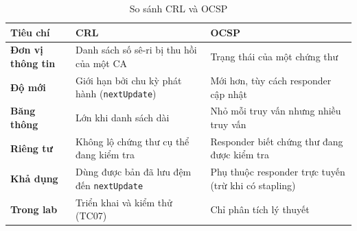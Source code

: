 \begin{table}[!htbp]
\centering
\small
\renewcommand{\arraystretch}{1.2}
\begin{tabularx}{\textwidth}{>{\raggedright\arraybackslash}p{3.2cm}>{\raggedright\arraybackslash}X>{\raggedright\arraybackslash}X}
\toprule
\textbf{Tiêu chí} & \textbf{CRL} & \textbf{OCSP} \\
\midrule
\textbf{Đơn vị thông tin} & Danh sách số sê-ri bị thu hồi của một CA & Trạng thái của một chứng thư \\
\midrule
\textbf{Độ mới} & Giới hạn bởi chu kỳ phát hành (\texttt{nextUpdate}) & Mới hơn, tùy cách responder cập nhật \\
\midrule
\textbf{Băng thông} & Lớn khi danh sách dài & Nhỏ mỗi truy vấn nhưng nhiều truy vấn \\
\midrule
\textbf{Riêng tư} & Không lộ chứng thư cụ thể đang kiểm tra & Responder biết chứng thư đang được kiểm tra \\
\midrule
\textbf{Khả dụng} & Dùng được bản đã lưu đệm đến \texttt{nextUpdate} & Phụ thuộc responder trực tuyến (trừ khi có stapling) \\
\midrule
\textbf{Trong lab} & Triển khai và kiểm thử (TC07) & Chỉ phân tích lý thuyết \\
\bottomrule
\end{tabularx}
\caption{So sánh CRL và OCSP}
\label{tab:crl-vs-ocsp}
\end{table}
